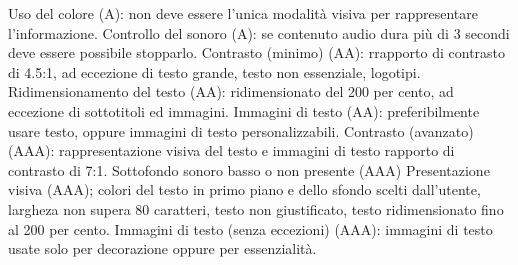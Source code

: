 \documentclass{article}
\begin{document}
\begin{enumerate}
	\subsubitem Uso del colore (A): non deve essere l'unica modalità visiva per rappresentare l'informazione.
	\subsubitem Controllo del sonoro (A): se contenuto audio dura più di 3 secondi deve essere possibile stopparlo.
	\subsubitem Contrasto (minimo) (AA): rrapporto di contrasto di 4.5:1, ad eccezione di testo grande, testo non essenziale, logotipi.
	\subsubitem Ridimensionamento del testo (AA): ridimensionato del 200 per cento, ad eccezione di sottotitoli ed immagini.
	\subsubitem Immagini di testo (AA): preferibilmente usare testo, oppure immagini di testo personalizzabili.
	\subsubitem Contrasto (avanzato) (AAA): rappresentazione visiva del testo e immagini di testo rapporto di contrasto di 7:1.
	\subsubitem Sottofondo sonoro basso o non presente (AAA)
	\subsubitem Presentazione visiva (AAA); colori del testo in primo piano e dello sfondo scelti dall'utente, largheza non supera 80 caratteri, testo non giustificato, testo ridimensionato fino al 200 per cento.
	\subsubitem Immagini di testo (senza eccezioni) (AAA): immagini di testo usate solo per decorazione oppure per essenzialità.
\end{enumerate}
\end{document}
